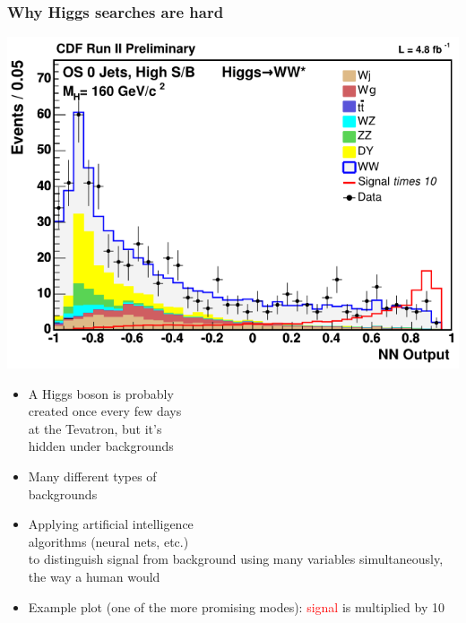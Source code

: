 \documentclass[compress]{beamer}
\begin{document}
\begin{frame}
\frametitle{Why Higgs searches are hard}

\hfill \includegraphics[width=0.5\linewidth]{tevatron_ww.png}

\vspace{-4 cm}
\begin{itemize}
\item A Higgs boson is probably \\
created once every few days \\
at the Tevatron, but it's \\
hidden under backgrounds

\item Many different types of \\
backgrounds

\item Applying artificial intelligence \\
algorithms (neural nets, etc.) \\
to distinguish signal from background using many variables
simultaneously, the way a human would

\item Example plot (one of the more promising modes):
  \textcolor{red}{signal} is multiplied by 10
\end{itemize}
\end{frame}
\end{document}
